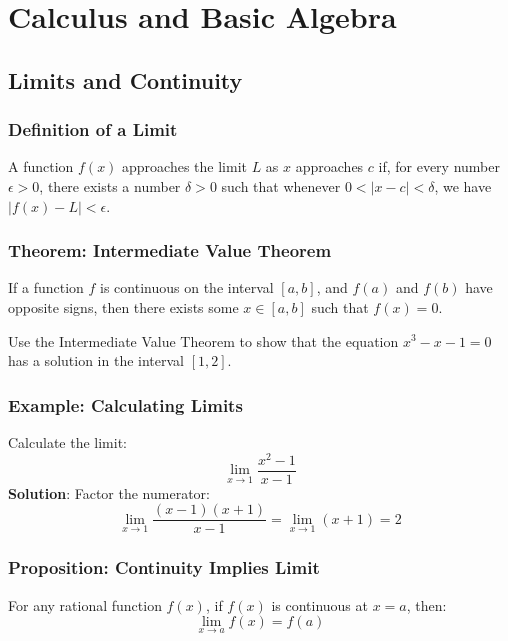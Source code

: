 \chapter{Calculus and Basic Algebra}

\section{Limits and Continuity}

\subsection{Definition of a Limit}
\begin{defi}
A function $f(x)$ approaches the limit $L$ as $x$ approaches $c$ if, for every number $\epsilon > 0$, there exists a number $\delta > 0$ such that whenever $0 < |x - c| < \delta$, we have $|f(x) - L| < \epsilon$.
\end{defi}

\subsection{Theorem: Intermediate Value Theorem}
\begin{theorem}
If a function $f$ is continuous on the interval $[a,b]$, and $f(a)$ and $f(b)$ have opposite signs, then there exists some $x \in [a,b]$ such that $f(x) = 0$.
\end{theorem}

\begin{exercise}
Use the Intermediate Value Theorem to show that the equation $x^3 - x - 1 = 0$ has a solution in the interval $[1, 2]$.
\end{exercise}

\subsection{Example: Calculating Limits}
\begin{example}
Calculate the limit:
\[
\lim_{x \to 1} \frac{x^2 - 1}{x - 1}
\]
\textbf{Solution}: Factor the numerator:
\[
\lim_{x \to 1} \frac{(x - 1)(x + 1)}{x - 1} = \lim_{x \to 1} (x + 1) = 2
\]
\end{example}

\subsection{Proposition: Continuity Implies Limit}
\begin{prop}
For any rational function $f(x)$, if $f(x)$ is continuous at $x = a$, then:
\[
\lim_{x \to a} f(x) = f(a)
\]
\end{prop}

